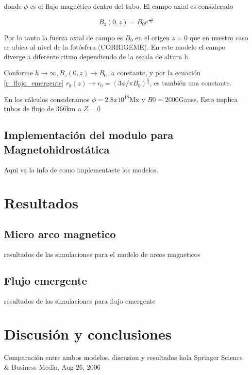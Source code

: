 \documentclass[9pt]{book}
\begin{document}
donde $\phi$ es el flujo magn\'etico dentro del tubo.
El campo axial es considerado

\begin{equation}
B_z(0,z)=B_0e^{\frac{-z}{h}}
\end{equation}

Por lo tanto la fuerza axial de campo es $B_0$ en el origen $z=0$ que en nuestro caso se ubica al nivel de la fot\'osfera (CORRIGEME). En este modelo el campo diverge a diferente ritmo dependiendo de la escala de altura h.

Conforme $h\rightarrow \infty , B_z(0,z) \rightarrow B_0$, $a$ constante, y por la ecuaci\'on \ref{r_flujo_emergente} $r_0(z) \rightarrow r_0 = (3\phi / \pi B_0)^\frac{1}{2}$, es tambi\'en una constante.

En los c\'alculos consideramos $\phi=2.8x10^18$Mx y $B0=2000$Gauss. Esto implica tubos de flujo de 366km a $Z=0$


\section{Implementaci\'on del modulo para Magnetohidrost\'atica}
Aqui va la info de como implementaste los modelos.


\chapter{Resultados}
\section{Micro arco magnetico}
resultados de las simulaciones para el modelo de arcos magneticos
\section{Flujo emergente}
resultados de las simulaciones para flujo emergente


\chapter{Discusi\'on y conclusiones}
Comparaci\'on entre ambos modelos, discusion y resultados
hola Springer Science \& Business Media, Aug 26, 2006
\end{document}
